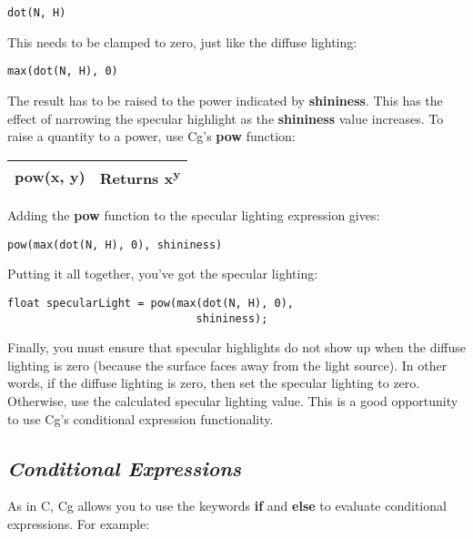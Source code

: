 \documentclass[../main.tex]{subfiles}
\begin{document}
\FloatBarrier
\begin{lstlisting}
dot(N, H)
\end{lstlisting}
\FloatBarrier

This needs to be clamped to zero, just like the diffuse lighting:

\FloatBarrier
\begin{lstlisting}
max(dot(N, H), 0)
\end{lstlisting}
\FloatBarrier

The result has to be raised to the power indicated by \textbf{shininess}. This has the effect of narrowing the specular highlight as the \textbf{shininess} value increases. To raise a quantity to a power, use Cg's \textbf{pow} function:

\FloatBarrier
\begin{table}
\centering
\begin{tabular}{ p{5cm} p{7cm}  } 
\hline
\textbf{pow(x, y)} & Returns \textbf{x\textsuperscript{y}} \\
\hline
\end{tabular}
\end{table}
\FloatBarrier

Adding the \textbf{pow} function to the specular lighting expression gives:

\FloatBarrier
\begin{lstlisting}
pow(max(dot(N, H), 0), shininess)
\end{lstlisting}
\FloatBarrier

Putting it all together, you've got the specular lighting:

\FloatBarrier
\begin{lstlisting}
float specularLight = pow(max(dot(N, H), 0),
                             shininess);
\end{lstlisting}
\FloatBarrier

Finally, you must ensure that specular highlights do not show up when the diffuse lighting is zero (because the surface faces away from the light source). In other words, if the diffuse lighting is zero, then set the specular lighting to zero. Otherwise, use the calculated specular lighting value. This is a good opportunity to use Cg's conditional expression functionality.

\subsection*{\textit{Conditional Expressions}}

As in C, Cg allows you to use the keywords \textbf{if} and \textbf{else} to evaluate conditional expressions. For example:
\end{document}
